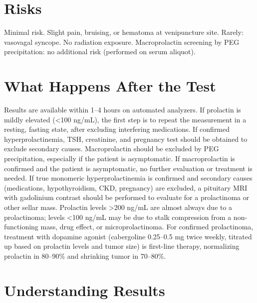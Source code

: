\section*{Risks}
Minimal risk. Slight pain, bruising, or hematoma at venipuncture site. Rarely: vasovagal syncope. No radiation exposure. Macroprolactin screening by PEG precipitation: no additional risk (performed on serum aliquot).

\section*{What Happens After the Test}
Results are available within 1--4 hours on automated analyzers. If prolactin is mildly elevated (<100 ng/mL), the first step is to repeat the measurement in a resting, fasting state, after excluding interfering medications. If confirmed hyperprolactinemia, TSH, creatinine, and pregnancy test should be obtained to exclude secondary causes. Macroprolactin should be excluded by PEG precipitation, especially if the patient is asymptomatic. If macroprolactin is confirmed and the patient is asymptomatic, no further evaluation or treatment is needed. If true monomeric hyperprolactinemia is confirmed and secondary causes (medications, hypothyroidism, CKD, pregnancy) are excluded, a pituitary MRI with gadolinium contrast should be performed to evaluate for a prolactinoma or other sellar mass. Prolactin levels >200 ng/mL are almost always due to a prolactinoma; levels <100 ng/mL may be due to stalk compression from a non-functioning mass, drug effect, or microprolactinoma. For confirmed prolactinoma, treatment with dopamine agonist (cabergoline 0.25--0.5 mg twice weekly, titrated up based on prolactin levels and tumor size) is first-line therapy, normalizing prolactin in 80--90\% and shrinking tumor in 70--80\%.

\section*{Understanding Results}

